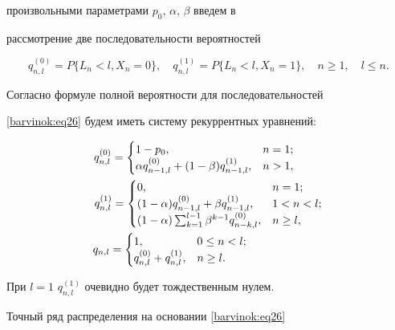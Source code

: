 произвольными параметрами $p_0$, $\alpha$, $\beta $ введем в

рассмотрение две последовательности вероятностей

\begin{equation}

\label{barvinok:eq26} q_{n,l}^{(0)} =P \{ L_n <l,X_n =0 \}, \quad

q_{n,l}^{(1)} = P \{L_n <l,X_n =1\}, \quad n\ge 1, \quad l\le n.

\end{equation}

Согласно формуле полной вероятности для последовательностей

\eqref{barvinok:eq26} будем иметь систему рекуррентных уравнений:

\begin{gather*}

q_{n,l}^{(0)} =\begin{cases} 1-p_0,& n=1; \\

\alpha q_{n-1,l}^{(0)} +(1-\beta)q_{n-1,l}^{(1)},&n>1,

\end{cases} \hspace{.9cm}\\

q_{n,l}^{(1)} =\begin{cases} 0, & n=1;  \\

(1-\alpha)q_{n-1,l}^{(0)} +\beta q_{n-1,l}^{(1)},& 1<n<l; \\

(1-\alpha)\sum_{k=1}^{l-1} \beta^{k-1}q_{n-k,l}^{(0)},& n\ge l, \\

\end{cases} \\

q_{n,l} =\begin{cases}

 1, & 0\le n<l; \\

 q_{n,l}^{(0)} +q_{n,l}^{(1)},& n\ge l.

\end{cases} \hspace{2.4cm}

\end{gather*}

При $l=1$ $q_{n,l}^{(1)}$ очевидно будет тождественным нулем.

Точный ряд распределения на основании \eqref{barvinok:eq26}

